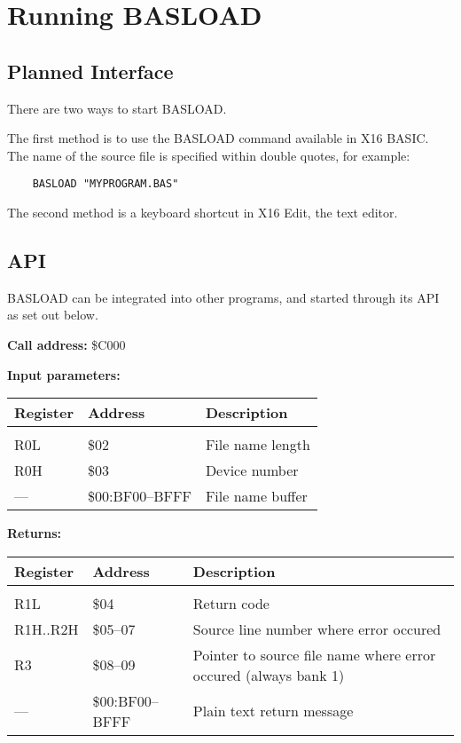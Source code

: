\documentclass{article}
\begin{document}
\section{Running BASLOAD}

    \subsection{Planned Interface}

        There are two ways to start BASLOAD.

        The first method is to use the BASLOAD command available in X16 BASIC. The
        name of the source file is specified within double quotes, for example:

        \begin{verbatim}
    BASLOAD "MYPROGRAM.BAS"
        \end{verbatim}

        The second method is a keyboard shortcut in X16 Edit, the text editor.

    \subsection{API}

        BASLOAD can be integrated into other programs, and started through its
        API as set out below.

        \vspace{1em}
        \textbf{Call address:} \$C000

        \textbf{Input parameters:} 

        \begin{longtable}[l]{l l p{6cm}}
            \textbf{Register} & \textbf{Address} & \textbf{Description} \\
	        \hline \\
            R0L & \$02            & File name length \\
            R0H & \$03            & Device number \\
            ---  & \$00:BF00--BFFF & File name buffer \\
        \end{longtable}
        \vspace{-1.5em}
        \textbf{Returns:} 

        \begin{longtable}[l]{l l p{6cm}}
            \textbf{Register} & \textbf{Address} & \textbf{Description} \\
	        \hline \\
            R1L      & \$04       & Return code \\
            R1H..R2H & \$05--07   & Source line number where error occured \\
            R3       & \$08--09   & Pointer to source file name where error occured (always bank 1) \\
            ---      & \$00:BF00--BFFF & Plain text return message \\
        \end{longtable}
\end{document}
